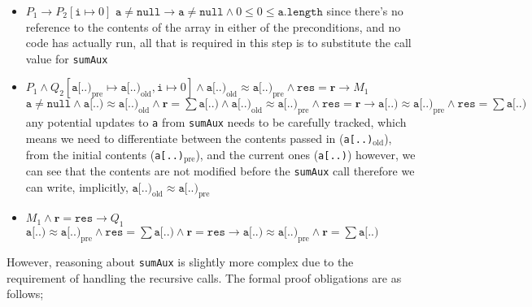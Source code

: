 \documentclass[a4paper, 12pt]{article}
\begin{document}
                \begin{itemize}
                    \itemsep0em
                    \item $P_1 \rightarrow P_2[\texttt{i} \mapsto 0]$
                        \subitem $\texttt{a} \neq \texttt{null} \rightarrow \texttt{a} \neq \texttt{null} \land 0 \leq 0 \leq \texttt{a.length}$
                        \subitem since there's no reference to the contents of the array in either of the preconditions, and no code has actually run, all that is required in this step is to substitute the call value for \texttt{sumAux}
                    \item $P_1 \land Q_2[\texttt{a[..)}_\text{pre} \mapsto \texttt{a[..)}_\text{old}, \texttt{i} \mapsto 0] \land \texttt{a[..)}_\text{old} \approx \texttt{a[..)}_\text{pre} \land \texttt{res} = \textbf{r} \rightarrow M_1$
                        \subitem $\texttt{a} \neq \texttt{null} \land \texttt{a[..)} \approx \texttt{a[..)}_\text{old} \land \textbf{r} = \sum \texttt{a[..)} \land \texttt{a[..)}_\text{old} \approx \texttt{a[..)}_\text{pre} \land \texttt{res} = \textbf{r} \rightarrow \texttt{a[..)} \approx \texttt{a[..)}_\text{pre} \land \texttt{res} = \sum \texttt{a[..)}$
                        \subitem any potential updates to \texttt{a} from \texttt{sumAux} needs to be carefully tracked, which means we need to differentiate between the contents passed in (\texttt{a[..)}$_\text{old}$), from the initial contents (\texttt{a[..)}$_\text{pre}$), and the current ones (\texttt{a[..)})
                        \subitem however, we can see that the contents are not modified before the \texttt{sumAux} call therefore we can write, implicitly, $\texttt{a[..)}_\text{old} \approx \texttt{a[..)}_\text{pre}$
                    \item $M_1 \land \textbf{r} = \texttt{res} \rightarrow Q_1$
                        \subitem $\texttt{a[..)} \approx \texttt{a[..)}_\text{pre} \land \texttt{res} = \sum \texttt{a[..)} \land \textbf{r} = \texttt{res} \rightarrow \texttt{a[..)} \approx \texttt{a[..)}_\text{pre} \land \textbf{r} = \sum \texttt{a[..)}$
                \end{itemize}
                However, reasoning about \texttt{sumAux} is slightly more complex due to the requirement of handling the recursive calls. The formal proof obligations are as follows;
\end{document}
